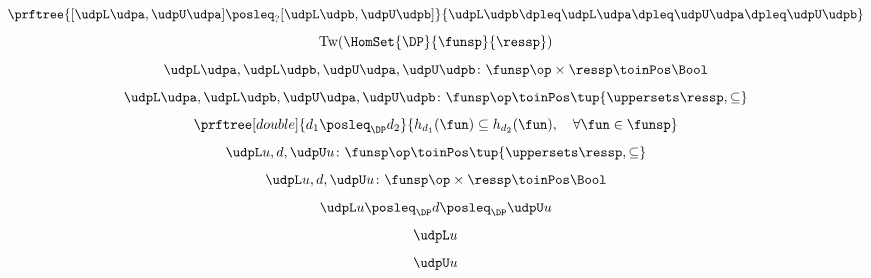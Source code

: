 {\begin{forslides}
        \begin{equation*}
            \label{eq:order_udp_1}
            \prftree{[\udpL\udpa,\udpU\udpa] \posleq_{?} [\udpL\udpb,\udpU\udpb]}{\udpL\udpb\dpleq\udpL\udpa\dpleq\udpU\udpa\dpleq\udpU\udpb}
        \end{equation*}
        \begin{equation*}
            \label{eq:order_udp_2}
            \text{Tw}(\HomSet{\DP}{\funsp}{\ressp})
        \end{equation*}
        \begin{equation*}
            \label{eq:order_udp_3}
            \udpL\udpa,\udpL\udpb,\udpU\udpa,\udpU\udpb\colon \funsp\op \times \ressp \toinPos \Bool
        \end{equation*}
        \begin{equation*}
            \label{eq:order_udp_4}
            \udpL\udpa,\udpL\udpb,\udpU\udpa,\udpU\udpb\colon \funsp\op \toinPos  \tup{\uppersets \ressp, \subseteq}
        \end{equation*}
        \begin{equation*}
            \label{eq:upos_dp_def_4}
            \prftree[double]{d_1\posleq_\DP d_2}{h_{d_1}(\fun)\subseteq h_{d_2}(\fun), \quad \forall \fun \in \funsp}
        \end{equation*}
        \begin{equation*}
            \label{eq:order_udp_5}
            \udpL u,d,\udpU u\colon \funsp\op \toinPos  \tup{\uppersets \ressp, \subseteq}
        \end{equation*}
        \begin{equation*}
            \label{eq:order_udp_6}
            \udpL u,d,\udpU u\colon  \funsp\op \times \ressp \toinPos \Bool
        \end{equation*}
        \begin{equation*}
            \label{eq:order_udp_7}
            \udpL u \posleq_\DP d \posleq_\DP \udpU u
        \end{equation*}
        \begin{equation*}
            \label{eq:order_udp_8}
            \udpL u
        \end{equation*}
        \begin{equation*}
            \label{eq:order_udp_9}
            \udpU u
        \end{equation*}
        \begin{equation*}
            \label{eq:order_udp_10}
            \begin{aligned}

\end{aligned}
\end{equation*}
\end{forslides}}
